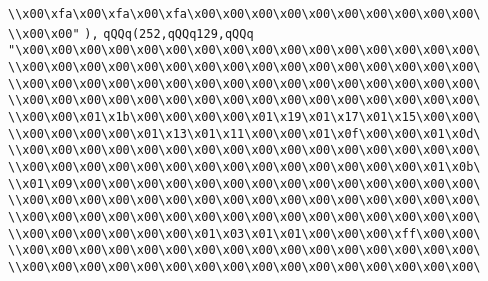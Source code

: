 \verb|\\x00\xfa\x00\xfa\x00\xfa\x00\x00\x00\x00\x00\x00\x00\x00\x00\x00\|\newline
\verb|\\x00\x00"|\newline
\verb|),|\newline
\verb|qQQq(252,qQQq129,qQQq|\newline
\verb|"\x00\x00\x00\x00\x00\x00\x00\x00\x00\x00\x00\x00\x00\x00\x00\x00\|\newline
\verb|\\x00\x00\x00\x00\x00\x00\x00\x00\x00\x00\x00\x00\x00\x00\x00\x00\|\newline
\verb|\\x00\x00\x00\x00\x00\x00\x00\x00\x00\x00\x00\x00\x00\x00\x00\x00\|\newline
\verb|\\x00\x00\x00\x00\x00\x00\x00\x00\x00\x00\x00\x00\x00\x00\x00\x00\|\newline
\verb|\\x00\x00\x01\x1b\x00\x00\x00\x00\x01\x19\x01\x17\x01\x15\x00\x00\|\newline
\verb|\\x00\x00\x00\x00\x01\x13\x01\x11\x00\x00\x01\x0f\x00\x00\x01\x0d\|\newline
\verb|\\x00\x00\x00\x00\x00\x00\x00\x00\x00\x00\x00\x00\x00\x00\x00\x00\|\newline
\verb|\\x00\x00\x00\x00\x00\x00\x00\x00\x00\x00\x00\x00\x00\x00\x01\x0b\|\newline
\verb|\\x01\x09\x00\x00\x00\x00\x00\x00\x00\x00\x00\x00\x00\x00\x00\x00\|\newline
\verb|\\x00\x00\x00\x00\x00\x00\x00\x00\x00\x00\x00\x00\x00\x00\x00\x00\|\newline
\verb|\\x00\x00\x00\x00\x00\x00\x00\x00\x00\x00\x00\x00\x00\x00\x00\x00\|\newline
\verb|\\x00\x00\x00\x00\x00\x00\x01\x03\x01\x01\x00\x00\x00\xff\x00\x00\|\newline
\verb|\\x00\x00\x00\x00\x00\x00\x00\x00\x00\x00\x00\x00\x00\x00\x00\x00\|\newline
\verb|\\x00\x00\x00\x00\x00\x00\x00\x00\x00\x00\x00\x00\x00\x00\x00\x00\|\newline
